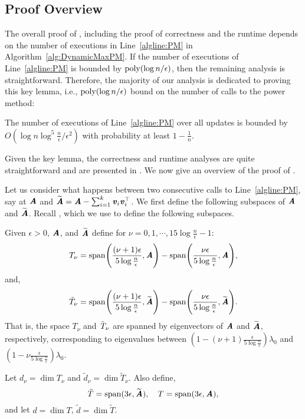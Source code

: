 \subsection{Proof Overview}
The overall proof of , including the proof of correctness and the runtime depends on the number of executions in Line~\ref{algline:PM} in Algorithm~\ref{alg:DynamicMaxPM}. If the number of executions of Line~\ref{algline:PM} is bounded by $\poly(\log n/\epsilon)$, then the remaining analysis is straightforward. Therefore, the majority of our analysis is dedicated to proving this key lemma, i.e., $\poly(\log n/\epsilon)$ bound on the number of calls to the power method:
\begin{lemma}\label{lem:BoundW}
The number of executions of Line~\ref{algline:PM} over all updates is bounded by $O(\log n\log^5\frac{n}{\epsilon}/\epsilon^2)$ with probability at least $1-\frac{1}{n}$.
\end{lemma}
Given the key lemma, the correctness and runtime analyses are quite straightforward and are presented in . We now give an overview of the proof of .


Let us consider what happens between two consecutive calls to Line~\ref{algline:PM}, say at $\AA$ and $\AAtil = \AA - \sum_{i=1}^k\vv_i\vv_i^{\top}$. We first define the following subspaces of $\AA$ and $\AAtil$.
Recall , which we use to define the following subspaces.

\begin{definition}\label{def:SpaceA} Given $\epsilon>0$, $\AA$, and $\AAtil$ define for $\nu = 0,1,\cdots, 15\log \frac{n}{\epsilon}-1$:
\[
T_{\nu} = \Span\left(\frac{(\nu+1)\epsilon}{5\log \frac{n}{\epsilon}},\AA\right) -\Span\left(\frac{\nu\epsilon}{5\log \frac{n}{\epsilon}},\AA\right),
\]
and,
\[
\tilde{T}_{\nu} = \Span\left(\frac{(\nu+1)\epsilon}{5\log \frac{n}{\epsilon}},\AAtil\right)-\Span\left(\frac{\nu\epsilon}{5\log \frac{n}{\epsilon}},\AAtil\right).
\]
That is, the space $T_{\nu}$ and $\Ttil_\nu$ are spanned by eigenvectors of $\AA$ and $\AAtil$, respectively, corresponding to eigenvalues between $\left(1-(\nu+1)\frac{\epsilon}{5\log \frac{n}{\epsilon}}\right)\lambda_0$ and $\left(1-\nu\frac{\epsilon}{5\log \frac{n}{\epsilon}}\right)\lambda_0$.

Let $d_{\nu} = \dim{T_{\nu}}$ and $\tilde{d}_{\nu} = \dim{\tilde{T}_{\nu}}$. Also define,
\[
\tilde{T} = \Span(3\epsilon,\AAtil),\quad  T = \Span(3\epsilon,\AA),
\]
and let $d = \dim{T}$, $\tilde{d} = \dim{\tilde{T}}$.
\end{definition}

